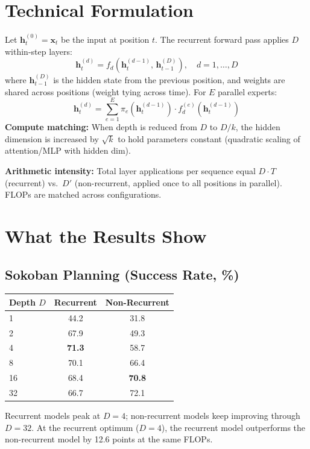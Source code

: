 \documentclass[10pt,twocolumn]{article}
\begin{document}
\section{Technical Formulation}

Let $\mathbf{h}_t^{(0)} = \mathbf{x}_t$ be the input at position $t$.
The recurrent forward pass applies $D$ within-step layers:
\[
  \mathbf{h}_t^{(d)} = f_d\!\left(\mathbf{h}_t^{(d-1)},\,
  \mathbf{h}_{t-1}^{(D)}\right), \quad d = 1,\ldots,D
\]
where $\mathbf{h}_{t-1}^{(D)}$ is the hidden state from the previous
position, and weights are shared across positions (weight tying across
time). For $E$ parallel experts:
\[
  \mathbf{h}_t^{(d)} = \sum_{e=1}^E \pi_e(\mathbf{h}_t^{(d-1)})
  \cdot f_d^{(e)}\!\left(\mathbf{h}_t^{(d-1)}\right)
\]
\textbf{Compute matching:} When depth is reduced from $D$ to $D/k$,
the hidden dimension is increased by $\sqrt{k}$ to hold parameters
constant (quadratic scaling of attention/MLP with hidden dim).

\textbf{Arithmetic intensity:} Total layer applications per sequence
equal $D\cdot T$ (recurrent) vs.\ $D'$ (non-recurrent, applied once
to all positions in parallel). FLOPs are matched across configurations.

\section{What the Results Show}

\subsection*{Sokoban Planning (Success Rate, \%)}

\begin{center}
\begin{tabular}{lcc}
\toprule
Depth $D$ & Recurrent & Non-Recurrent \\
\midrule
1  & 44.2 & 31.8 \\
2  & 67.9 & 49.3 \\
4  & \textbf{71.3} & 58.7 \\
8  & 70.1 & 66.4 \\
16 & 68.4 & \textbf{70.8} \\
32 & 66.7 & 72.1 \\
\bottomrule
\end{tabular}
\end{center}

Recurrent models peak at $D=4$; non-recurrent models keep improving
through $D=32$. At the recurrent optimum ($D=4$), the recurrent model
outperforms the non-recurrent model by 12.6 points at the same FLOPs.
\end{document}
